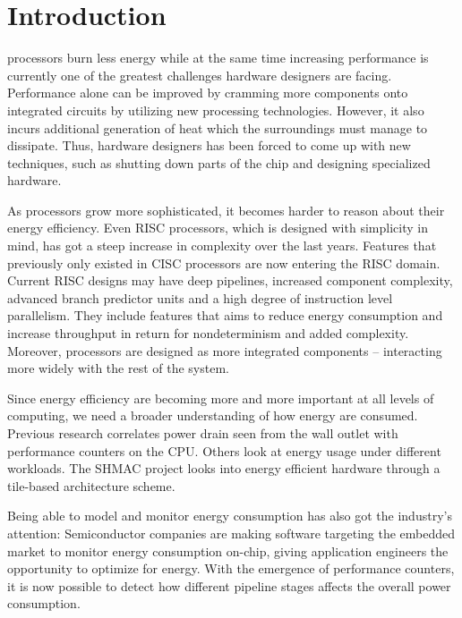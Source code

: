 \section{Introduction}

 processors burn less energy while at the same time
increasing performance is currently one of the greatest challenges hardware
designers are facing. Performance alone can be improved by cramming more
components onto integrated circuits \cite{moore1965cramming} by utilizing new
processing technologies. However, it also incurs additional generation of heat
which the surroundings must manage to dissipate. Thus, hardware designers has
been forced to come up with new techniques, such as shutting down parts of the
chip \cite{esmaeilzadeh2011dark} and designing specialized hardware.

As processors grow more sophisticated, it becomes harder to reason about their
energy efficiency. Even RISC processors, which is designed with simplicity in
mind\cite{sivarama}, has got a steep increase in complexity over the last
years\cite{alf_egil_bogen_cisc_risc_blog}. Features that previously only existed
in CISC processors are now entering the RISC domain. Current RISC designs may
have deep pipelines, increased component complexity, advanced branch predictor
units and a high degree of instruction level parallelism. They include features
that aims to reduce energy consumption and increase throughput in return for
nondeterminism and added complexity. Moreover, processors are designed as more
integrated components -- interacting more widely with the rest of the system.

Since energy efficiency are becoming more and more important at all levels of
computing, we need a broader understanding of how energy are consumed. Previous
research correlates power drain seen from the wall outlet with performance
counters on the CPU\cite{singh}\cite{bertran}\cite{bircher}. Others look at
energy usage under different workloads\cite{carroll2010analysis}. The SHMAC
project\cite{Umuroglu662354}\cite{rusten2012implementing} looks into energy
efficient hardware through a tile-based architecture scheme.

Being able to model and monitor energy consumption has also
got the industry's attention: Semiconductor companies are making software
targeting the embedded market to monitor energy consumption on-chip, giving
application engineers the opportunity to optimize for energy. With the emergence
of performance counters, it is now possible to detect how different pipeline
stages affects the overall power consumption\cite{bertran}.

